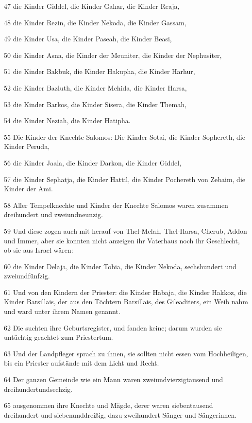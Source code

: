 \par 47 die Kinder Giddel, die Kinder Gahar, die Kinder Reaja,
\par 48 die Kinder Rezin, die Kinder Nekoda, die Kinder Gassam,
\par 49 die Kinder Usa, die Kinder Paseah, die Kinder Beasi,
\par 50 die Kinder Asna, die Kinder der Meuniter, die Kinder der Nephusiter,
\par 51 die Kinder Bakbuk, die Kinder Hakupha, die Kinder Harhur,
\par 52 die Kinder Bazluth, die Kinder Mehida, die Kinder Harsa,
\par 53 die Kinder Barkos, die Kinder Sisera, die Kinder Themah,
\par 54 die Kinder Neziah, die Kinder Hatipha.
\par 55 Die Kinder der Knechte Salomos: Die Kinder Sotai, die Kinder Sophereth, die Kinder Peruda,
\par 56 die Kinder Jaala, die Kinder Darkon, die Kinder Giddel,
\par 57 die Kinder Sephatja, die Kinder Hattil, die Kinder Pochereth von Zebaim, die Kinder der Ami.
\par 58 Aller Tempelknechte und Kinder der Knechte Salomos waren zusammen dreihundert und zweiundneunzig.
\par 59 Und diese zogen auch mit herauf von Thel-Melah, Thel-Harsa, Cherub, Addon und Immer, aber sie konnten nicht anzeigen ihr Vaterhaus noch ihr Geschlecht, ob sie aus Israel wären:
\par 60 die Kinder Delaja, die Kinder Tobia, die Kinder Nekoda, sechshundert und zweiundfünfzig.
\par 61 Und von den Kindern der Priester: die Kinder Habaja, die Kinder Hakkoz, die Kinder Barsillais, der aus den Töchtern Barsillais, des Gileaditers, ein Weib nahm und ward unter ihrem Namen genannt.
\par 62 Die suchten ihre Geburtsregister, und fanden keine; darum wurden sie untüchtig geachtet zum Priestertum.
\par 63 Und der Landpfleger sprach zu ihnen, sie sollten nicht essen vom Hochheiligen, bis ein Priester aufstände mit dem Licht und Recht.
\par 64 Der ganzen Gemeinde wie ein Mann waren zweiundvierzigtausend und dreihundertundsechzig.
\par 65 ausgenommen ihre Knechte und Mägde, derer waren siebentausend dreihundert und siebenunddreißig, dazu zweihundert Sänger und Sängerinnen.
